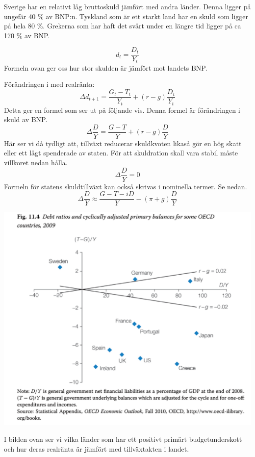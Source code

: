 \documentclass{article}
\begin{document}
Sverige har en relativt låg bruttoskuld jämfört med andra länder. Denna ligger på ungefär 40 \% av BNP:n. Tyskland som är ett starkt land har en skuld som ligger på hela 80 \%. Grekerna som har haft det svårt under en längre tid ligger på ca 170 \% av BNP. 

$$
d_t = \frac{D_t}{Y_t}
$$
Formeln ovan ger oss hur stor skulden är jämfört mot landets BNP. 
\vspace{5mm} \par \noindent Förändringen i med realränta: 
$$
\Delta d_{t+1} = \frac{G_t-T_t}{Y_t} + (r-g)\frac{D_t}{Y_t}
$$
Detta ger en formel som ser ut på följande vis. Denna formel är förändringen i skuld av BNP. 
$$
\Delta \frac{D}{Y} = \frac{G-T}{Y} + (r-g)\frac{D}{Y}
$$
Här ser vi då tydligt att, tillväxt reducerar skuldkvoten likaså gör en hög skatt eller ett lågt spenderade av staten. För att skuldration skall vara stabil måste villkoret nedan hålla.
$$
\Delta \frac{D}{Y} = 0
$$
Formeln för statens skuldtillväxt kan också skrivas i nominella termer. Se nedan.
$$
\Delta \frac{D}{Y} \approx \frac{G-T-iD}{Y} - (\pi + g)\frac{D}{Y} 
$$


\includegraphics[scale=0.5]{skarm12}
\vspace{5mm} \par \noindent 
I bilden ovan ser vi vilka länder som har ett positivt primärt budgetunderskott och hur deras realränta är jämfört med tillväxtakten i landet. 

\vspace{5mm} \par \noindent 
\end{document}
